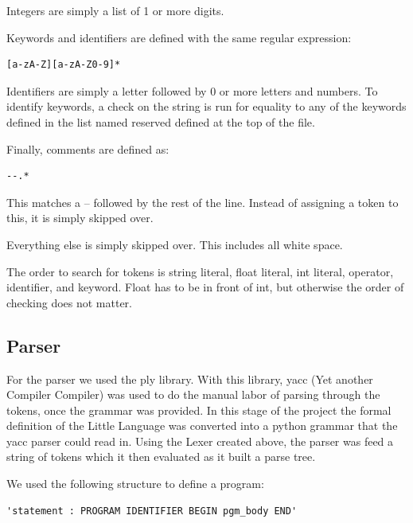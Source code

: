 \documentclass[12pt]{article}
\begin{document}
                Integers are simply a list of 1 or more digits.

                Keywords and identifiers are defined with the same regular expression:

                \begin{verbatim}
[a-zA-Z][a-zA-Z0-9]*
                \end{verbatim}

                Identifiers are simply a letter followed by 0 or more letters and numbers. To identify keywords, a check on the string is run for equality to any of the keywords defined in the list named reserved defined at the top of the file.

                Finally, comments are defined as:

                \begin{verbatim}
--.*
                \end{verbatim}

                This matches a -- followed by the rest of the line. Instead of assigning a token to this, it is simply skipped over.

                Everything else is simply skipped over. This includes all white space.

                The order to search for tokens is string literal, float literal, int literal, operator, identifier, and keyword. Float has to be in front of int, but otherwise the order of checking does not matter.




        \subsection{Parser}
            For the parser we used the ply library.  With this library, yacc (Yet another Compiler Compiler) was used to do the manual labor of parsing through the tokens, once the grammar was provided.   In this stage of the project the formal definition of the Little Language was converted into a python grammar that the yacc parser could read in.  Using the Lexer created above, the parser was feed a string of tokens which it then evaluated as it built a parse tree.  
            
            We used the following structure to define a program: 
            \begin{verbatim}
'statement : PROGRAM IDENTIFIER BEGIN pgm_body END'
           \end{verbatim}
           
\end{document}
